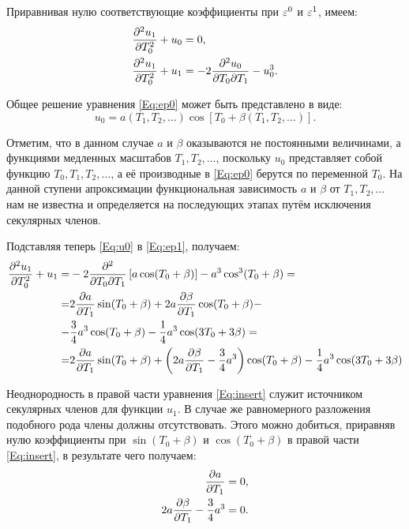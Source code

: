 Приравнивая нулю соответствующие коэффициенты при $\varepsilon^0$ и $\varepsilon^1$,
имеем:
\begin{align}
    \pdv[2]{u_1}{T_0} + u_0 & = 0, \label{Eq:ep0} \\ 
    \pdv[2]{u_1}{T_0} + u_1 & = -2 \pdv{u_0}{T_0}{T_1} - u_0^3. \label{Eq:ep1} 
\end{align}

Общее решение уравнения \eqref{Eq:ep0}
может быть представлено в виде:
\begin{equation} \label{Eq:u0}
    u_0 = a(T_1, T_2, \dots) \cos\left[T_0 + \beta(T_1, T_2, \dots)\right]. 
\end{equation}

Отметим, что в данном случае $a$ и $\beta$ оказываются
не постоянными величинами, а функциями медленных масштабов $T_1, T_2, \dots$,
поскольку $u_0$ представляет собой функцию $T_0, T_1, T_2, \dots$,
а её производные в \eqref{Eq:ep0} берутся по переменной $T_0$.
На данной ступени апроксимации функциональная зависимость
$a$ и $\beta$ от $T_1, T_2, \dots$ нам не известна и определяется
на последующих этапах путём исключения секулярных членов.

Подставляя теперь \eqref{Eq:u0} в \eqref{Eq:ep1}, получаем:
\begin{align}
    \pdv[2]{u_1}{T_0} + u_1 = &
    -2 \pdv{}{T_0}{T_1} \left[ a \cos(T_0 + \beta) \right]
    -a^3 \cos^3(T_0 + \beta) = \nonumber \\
    = & 2 \pdv{a}{T_1} \sin(T_0 + \beta) +
    2 a \pdv{\beta}{T_1} \cos(T_0 + \beta) - \nonumber \\
    - & \frac{3}{4} a^3 \cos(T_0 + \beta) -
    \frac{1}{4} a^3 \cos(3 T_0 + 3 \beta) = \nonumber \\
    = & 2 \pdv{a}{T_1} \sin(T_0 + \beta) +
    \left( 2 a \pdv{\beta}{T_1} - \frac{3}{4} a^3 \right)
    \cos(T_0 + \beta) - \frac{1}{4} a^3 \cos(3 T_0 + 3 \beta) \label{Eq:insert}
\end{align}

Неоднородность в правой части уравнения \eqref{Eq:insert}
служит источником секулярных членов для функции $u_1$.
В случае же равномерного разложения подобного рода члены
должны отсутствовать.
Этого можно добиться, приравняв нулю коэффициенты при
$\sin(T_0 + \beta)$ и $\cos(T_0 + \beta)$
в правой части \eqref{Eq:insert},
в результате чего получаем:
\begin{align}
    \pdv{a}{T_1} & = 0, \label{Eq:seq0} \\
    2 a \pdv{\beta}{T_1} - \frac{3}{4} a^3 & = 0. \label{Eq:seq1}
\end{align}

